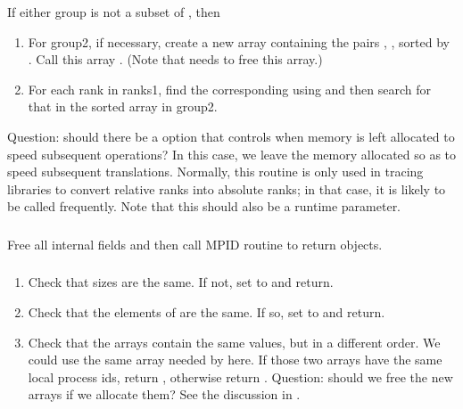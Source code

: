 \documentclass{article}
\begin{document}
\begin{algorithm}
If either group is not a subset of , then 
\begin{enumerate}
\item For group2, if necessary, create a new array containing the pairs
  , , sorted by . Call this array .
  (Note that  needs to free this array.)
\item For each rank in ranks1, find the corresponding 
  using  and then search for that in
  the sorted array in group2.   
\end{enumerate}
\end{algorithm}

Question: should there be a  option that controls when
memory is left allocated to speed subsequent operations?  In this case, we
leave the memory allocated so as to speed subsequent translations.  Normally,
this routine is only used in tracing libraries to convert relative ranks into
absolute ranks; in that case, it is likely to be called frequently.
Note that this should also be a runtime parameter.

\subsubsection{}
Free all internal fields and then call MPID routine to return objects.

\subsubsection{}
\begin{enumerate}
\item Check that sizes are the same.  If not, set  to
   and return.
\item Check that the elements of  are the same.  If so,
set  to  and return.
\item Check that the  arrays
  contain the same values, but 
  in a different order.  We could use the same array needed by
   here.  If those two arrays have the same
  local process ids, return , otherwise return
  .  
  Question: should we free the new arrays if we allocate them?  See
  the discussion in .
\end{enumerate}
\end{document}
